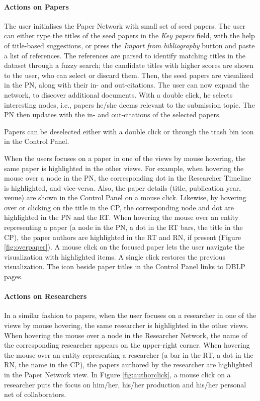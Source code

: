\paragraph*{Actions on Papers} 
The user initialises the Paper Network with small set of seed papers. The user can either type the titles of the seed papers in the \emph{Key papers} field, with the help of title-based suggestions, or press the \emph{Import from bibliography} button and paste a list of references. The references are parsed to identify matching titles in the dataset through a fuzzy search; the candidate titles with higher scores are shown to the user, who can select or discard them. Then, the seed papers are visualized in the PN, along with their in- and out-citations. The user can now expand the network, to discover additional documents. With a double click, he selects interesting nodes, i.e., papers he/she deems relevant to the submission topic. The PN then updates with the in- and out-citations of the selected papers. 

Papers can be deselected either with a double click or through the trash bin icon in the Control Panel. 

When the users focuses on a paper in one of the views by mouse hovering, the same paper is highlighted in the other views. For example, when hovering the mouse over a node in the PN, the corresponding dot in the Researcher Timeline is highlighted, and vice-versa. Also, the paper details (title, publication year, venue) are shown in the Control Panel on a mouse click. Likewise, by hovering over or clicking on the title in the CP, the corresponding node and dot are highlighted in the PN and the RT. When hovering the mouse over an entity representing a paper (a node in the PN, a dot in the RT bars, the title in the CP), the paper authors are highlighted in the RT and RN, if present (Figure \ref{fig:overpaper}). A mouse click on the focused paper lets the user navigate the visualization with highlighted items. A single click restores the previous visualization.
The icon beside paper titles in the Control Panel links to DBLP pages. 

\paragraph*{Actions on Researchers} In a similar fashion to papers, when the user focuses on a researcher in one of the views by mouse hovering, the same researcher is highlighted in the other views. When hovering the mouse over a node in the Researcher Network, the name of the corresponding researcher appears on the upper-right corner.  
When hovering the mouse over an entity representing a researcher (a bar in the RT, a dot in the RN, the name in the CP), the papers authored by the researcher are highlighted in the Paper Network view. 
In Figure \ref{fig:authorclick}, a mouse click on a researcher puts the focus on him/her, his/her production and his/her personal net of collaborators. 

